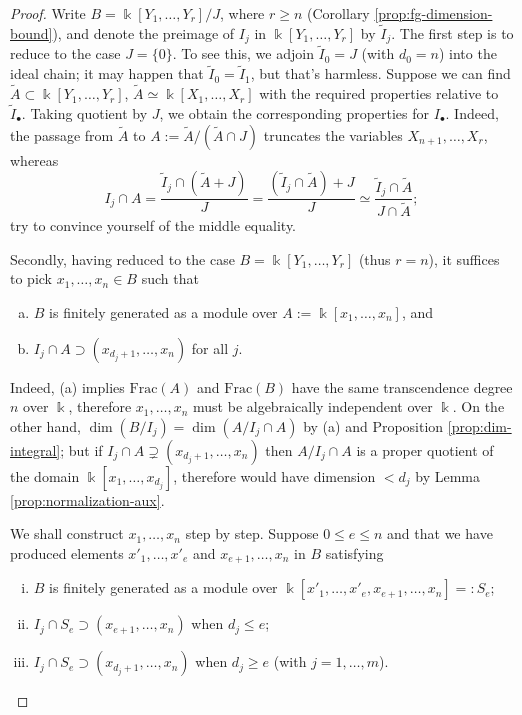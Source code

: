 \begin{proof}
	Write $B = \Bbbk[Y_1, \ldots, Y_r]/J$, where $r \geq n$ (Corollary \ref{prop:fg-dimension-bound}), and denote the preimage of $I_j$ in $\Bbbk[Y_1, \ldots, Y_r]$ by $\tilde{I}_j$. The first step is to reduce to the case $J=\{0\}$. To see this, we adjoin $\tilde{I}_0 = J$ (with $d_0 = n$) into the ideal chain; it may happen that $\tilde{I}_0 = \tilde{I}_1$, but that's harmless. Suppose we can find $\tilde{A} \subset \Bbbk[Y_1, \ldots, Y_r]$, $\tilde{A} \simeq \Bbbk[X_1, \ldots, X_r]$ with the required properties relative to $\tilde{I}_\bullet$. Taking quotient by $J$, we obtain the corresponding properties for $I_\bullet$. Indeed, the passage from $\tilde{A}$ to $A := \tilde{A}/(\tilde{A} \cap J)$ truncates the variables $X_{n + 1}, \ldots, X_r$, whereas
	\[ I_j \cap A = \frac{\tilde{I}_j \cap (\tilde{A} + J)}{J} = \frac{(\tilde{I}_j \cap \tilde{A}) + J}{J}  \simeq \frac{\tilde{I}_j \cap \tilde{A}}{J \cap \tilde{A}}; \]
	try to convince yourself of the middle equality.

	Secondly, having reduced to the case $B = \Bbbk[Y_1, \ldots, Y_r]$ (thus $r = n$), it suffices to pick $x_1, \ldots, x_n \in B$ such that
	\begin{enumerate}[(a)]
		\item $B$ is finitely generated as a module over $A := \Bbbk[x_1, \ldots, x_n]$, and
		\item $I_j \cap A \supset (x_{d_j+1}, \ldots, x_n)$ for all $j$.
	\end{enumerate}
	Indeed, (a) implies $\mathrm{Frac}(A)$ and $\mathrm{Frac}(B)$ have the same transcendence degree $n$ over $\Bbbk$, therefore $x_1, \ldots, x_n$ must be algebraically independent over $\Bbbk$. On the other hand, $\dim(B/I_j) = \dim(A/I_j \cap A)$ by (a) and Proposition \ref{prop:dim-integral}; but if $I_j \cap A \supsetneq (x_{d_j+1}, \ldots, x_n)$ then $A/I_j \cap A$ is a proper quotient of the domain $\Bbbk[x_1, \ldots, x_{d_j}]$, therefore would have dimension $< d_j$ by Lemma \ref{prop:normalization-aux}.
	
	We shall construct $x_1, \ldots, x_n$ step by step. Suppose $0 \leq e \leq n$ and that we have produced elements $x'_1, \ldots, x'_e$ and $x_{e+1}, \ldots, x_n$ in $B$ satisfying
	\begin{enumerate}[(i)]
		\item $B$ is finitely generated as a module over $\Bbbk[x'_1, \ldots, x'_e, x_{e+1}, \ldots, x_n] =: S_e$;
		\item $I_j \cap S_e \supset (x_{e+1}, \ldots, x_n)$ when $d_j \leq e$;
		\item $I_j \cap S_e \supset (x_{d_j + 1}, \ldots, x_n)$ when $d_j \geq e$ (with $j = 1, \ldots, m$).
	\end{enumerate}


\end{proof}
